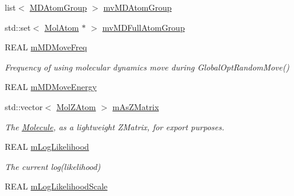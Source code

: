 \begin{DoxyCompactItemize}
list$<$ \mbox{\hyperlink{struct_obj_cryst_1_1_m_d_atom_group}{M\+D\+Atom\+Group}} $>$ \mbox{\hyperlink{class_obj_cryst_1_1_molecule_a4a3a91c91753e90de67341701df7e081}{mv\+M\+D\+Atom\+Group}}
\item 
std\+::set$<$ \mbox{\hyperlink{class_obj_cryst_1_1_mol_atom}{Mol\+Atom}} $\ast$ $>$ \mbox{\hyperlink{class_obj_cryst_1_1_molecule_af3e1420d9c1c4cc3be0e58c5834130e7}{mv\+M\+D\+Full\+Atom\+Group}}
\item 
\mbox{\label{class_obj_cryst_1_1_molecule_aee36f14d21f12d10581eaaf689136304}} 
R\+E\+AL \mbox{\hyperlink{class_obj_cryst_1_1_molecule_aee36f14d21f12d10581eaaf689136304}{m\+M\+D\+Move\+Freq}}
\begin{DoxyCompactList}\small\item\em Frequency of using molecular dynamics move during Global\+Opt\+Random\+Move() \end{DoxyCompactList}\item 
R\+E\+AL \mbox{\hyperlink{class_obj_cryst_1_1_molecule_a600a62199c1e9297d39a53848a155310}{m\+M\+D\+Move\+Energy}}
\item 
\mbox{\label{class_obj_cryst_1_1_molecule_a45e0d1e1d54f4474158f270571957d4a}} 
std\+::vector$<$ \mbox{\hyperlink{struct_obj_cryst_1_1_mol_z_atom}{Mol\+Z\+Atom}} $>$ \mbox{\hyperlink{class_obj_cryst_1_1_molecule_a45e0d1e1d54f4474158f270571957d4a}{m\+As\+Z\+Matrix}}
\begin{DoxyCompactList}\small\item\em The \mbox{\hyperlink{class_obj_cryst_1_1_molecule}{Molecule}}, as a lightweight Z\+Matrix, for export purposes. \end{DoxyCompactList}\item 
\mbox{\label{class_obj_cryst_1_1_molecule_aca5a25791960a8aa011c1cfa902c589a}} 
R\+E\+AL \mbox{\hyperlink{class_obj_cryst_1_1_molecule_aca5a25791960a8aa011c1cfa902c589a}{m\+Log\+Likelihood}}
\begin{DoxyCompactList}\small\item\em The current log(likelihood) \end{DoxyCompactList}\item 
R\+E\+AL \mbox{\hyperlink{class_obj_cryst_1_1_molecule_a7e69eecc5aa10a9908c3a6450cc2540b}{m\+Log\+Likelihood\+Scale}}
\item 
\mbox{\label{class_obj_cryst_1_1_molecule_a9e9be5fe3d3037cdf690df16235e370d}} 

\end{DoxyCompactItemize}
